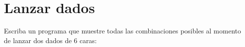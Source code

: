 \section{Lanzar dados}

Escriba un programa que muestre todas las combinaciones posibles al
momento de lanzar dos dados de 6 caras:
